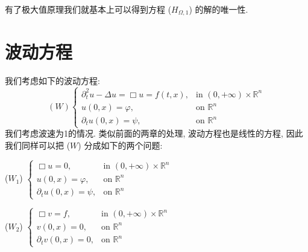 \documentclass[11pt]{ctexart}[UTF8]
\begin{document}
有了极大值原理我们就基本上可以得到方程 ($H_{\Omega,1}$) 的解的唯一性. 
\newpage
\section{波动方程}
我们考虑如下的波动方程:
\begin{equation*}
    (W)
    \begin{cases}
    \partial_{t}^2 u - \Delta u =\Box u= f(t,x), & \text{in } (0,+\infty)\times\mathbb{R}^n\\
    u(0,x) = \varphi, & \text{on }  \mathbb{R}^n\\
    \partial_{t} u(0,x) = \psi, & \text{on }  \mathbb{R}^n
    \end{cases}
\end{equation*}
我们考虑波速为1的情况. 类似前面的两章的处理, 波动方程也是线性的方程, 因此我们同样可以把 ($W$) 分成如下的两个问题:\par
($W_{1}$) $\begin{cases}
    \Box u = 0, & \text{in } (0,+\infty)\times\mathbb{R}^n\\
    u(0,x) = \varphi, & \text{on }  \mathbb{R}^n\\
    \partial_{t} u(0,x) = \psi, & \text{on }  \mathbb{R}^n
\end{cases}$\par
($W_{2}$) $\begin{cases}
    \Box v = f, & \text{in } (0,+\infty)\times\mathbb{R}^n\\
    v(0,x) = 0, & \text{on }  \mathbb{R}^n\\
    \partial_{t} v(0,x) = 0, & \text{on }  \mathbb{R}^n
\end{cases}$\par
\end{document}
